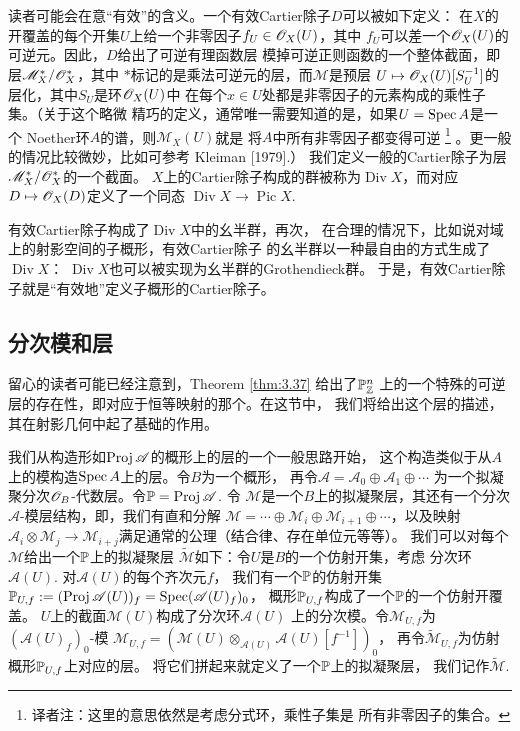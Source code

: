 读者可能会在意“有效”的含义。一个有效Cartier除子$D$可以被如下定义：
在$X$的开覆盖的每个开集$U$上给一个非零因子$f_U\in \oo_X(U)$，其中%
$f_U$可以差一个$\oo_X(U)$的可逆元。因此，$D$给出了可逆有理函数层
模掉可逆正则函数的一个整体截面，即层$\mathscr M_X^*/\oo_X^*$，其中
$*$标记的是乘法可逆元的层，而$\mathscr M$是预层
$U\mapsto \oo_X(U)[S_U^{-1}]$的层化，其中$S_U$是环$\oo_X(U)$中
在每个$x\in U$处都是非零因子的元素构成的乘性子集。（关于这个略微
精巧的定义，通常唯一需要知道的是，如果$U=\spec A$是一个
Noether环$A$的谱，则$\mathscr M_X(U)$就是
将$A$中所有非零因子都变得可逆%
\footnote{译者注：这里的意思依然是考虑分式环，乘性子集是%
所有非零因子的集合。}%
。更一般的情况比较微妙，比如可参考 Kleiman [1979].）
我们定义一般的Cartier除子为层$\mathscr M_X^*/\oo_X^*$的一个截面。
$X$上的Cartier除子构成的群被称为$\operatorname{Div} X$，而对应
$D\mapsto \oo_X(D)$定义了一个同态
$\operatorname{Div} X\to \operatorname{Pic} X$.

有效Cartier除子构成了$\operatorname{Div} X$中的幺半群，再次，
在合理的情况下，比如说对域上的射影空间的子概形，有效Cartier除子
的幺半群以一种最自由的方式生成了$\operatorname{Div} X$：
$\operatorname{Div} X$也可以被实现为幺半群的Grothendieck群。
于是，有效Cartier除子就是“有效地”定义子概形的Cartier除子。

\subsection{分次模和层} \label{s:3.2.6}

留心的读者可能已经注意到，Theorem \ref{thm:3.37} 给出了$\P_\zz^n$
上的一个特殊的可逆层的存在性，即对应于恒等映射的那个。在这节中，
我们将给出这个层的描述，其在射影几何中起了基础的作用。

我们从构造形如$\proj \mathscr A$的概形上的层的一个一般思路开始，
这个构造类似于从$A$上的模构造$\spec A$上的层。令$B$为一个概形，
再令$\mathscr A=\mathscr A_0\oplus\mathscr A_1\oplus\cdots$
为一个拟凝聚分次$\oo_B$-代数层。令$\P=\proj \mathscr A$. 令
$\mathscr M$是一个$B$上的拟凝聚层，其还有一个分次
$\mathscr A$-模层结构，即，我们有直和分解
$\mathscr M=\cdots\oplus \mathscr M_i\oplus \mathscr M_{i+1}
\oplus \cdots$，以及映射$\mathscr A_i\otimes \mathscr M_j
\to \mathscr M_{i+j}$满足通常的公理（结合律、存在单位元等等）。
我们可以对每个$\mathscr M$给出一个$\P$上的拟凝聚层
$\widetilde{\mathscr M}$如下：令$U$是$B$的一个仿射开集，考虑
分次环$\mathscr A(U)$. 对$\mathscr A(U)$的每个齐次元$f$，
我们有一个$\P$的仿射开集
$\P_{U,f}:=(\proj \mathscr A(U))_f=\spec (\mathscr A(U)_f)_0$，
概形$\P_{U,f}$构成了一个$\P$的一个仿射开覆盖。
$U$上的截面$\mathscr M(U)$构成了分次环$\mathscr A(U)$
上的分次模。令$\mathscr M_{U,f}$为$(\mathscr A(U)_f)_0$-模
$\mathscr M_{U,f}=(\mathscr M(U)
\otimes_{\mathscr A(U)}\mathscr A(U)[f^{-1}])_0$，
再令$\widetilde{\mathscr M}_{U,f}$为仿射概形$\P_{U,f}$上对应的层。
将它们拼起来就定义了一个$\P$上的拟凝聚层，
我们记作$\widetilde{\mathscr M}$.

